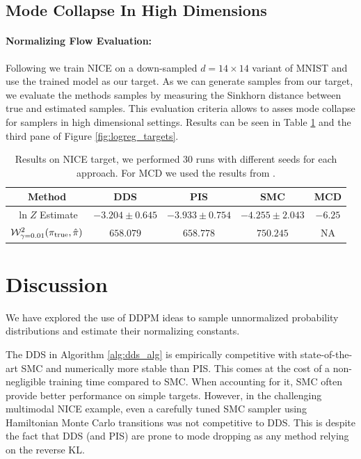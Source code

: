 \documentclass{article} %
\begin{document}
\subsection{Mode Collapse In High Dimensions}
\paragraph{Normalizing Flow Evaluation:} Following \cite{doucet2022annealed} we train NICE \citep{dinh2014nice} on a down-sampled $d=14 \times 14$ variant of MNIST \citep{mnist} and use the trained model as our target. As we can generate samples from our target, we evaluate the methods samples by measuring the Sinkhorn distance between true and estimated samples. This evaluation criteria allows to asses mode collapse for samplers in high dimensional settings. Results can be seen in Table \ref{tab:was} and the third pane of Figure \ref{fig:logreg_targets}.

\begin{table}[H]
\centering
\begin{tabular}{@{}ccccc@{}}
\toprule
Method & DDS  & PIS & SMC & MCD \\ \midrule
$\ln Z$ Estimate     & $-3.204 \pm 0.645$  & $-3.933 \pm 0.754$  & $-4.255 \pm 2.043$ &       $-6.25 $                                  \\
${\mathcal{W}}^2_{\gamma=0.01}(\pi_{\mathrm{true}}, \hat{\pi})$    & $658.079$  & $658.778$ & $750.245$ &  NA \\
 \bottomrule
\end{tabular}
\caption{Results on NICE target, we performed 30 runs with different seeds for each approach. For MCD we used the results from \citep{doucet2022annealed}. \label{tab:was}}
\end{table}
\section{Discussion}
We have explored the use of DDPM ideas to sample unnormalized probability distributions and estimate their normalizing constants. 

The DDS in Algorithm \ref{alg:dds_alg} is empirically competitive with state-of-the-art SMC and numerically more stable than PIS. This comes at the cost of a non-negligible training time compared to SMC. When accounting for it, SMC often provide better performance on simple targets. However, in the challenging multimodal NICE example, even a carefully tuned SMC sampler using Hamiltonian Monte Carlo transitions was not competitive to DDS. This is despite the fact that DDS (and PIS) are prone to mode dropping as any method relying on the reverse KL.
\end{document}
